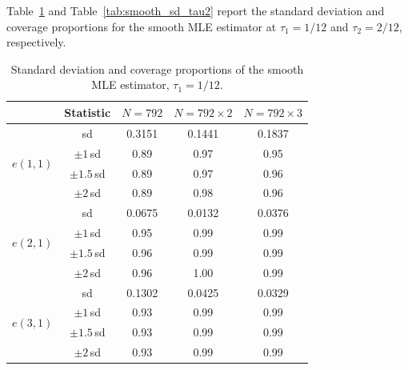 \documentclass[12pt]{article}
\begin{document}
Table~\ref{tab:smooth_sd_tau1} and Table~\ref{tab:smooth_sd_tau2} report
the standard deviation and coverage proportions for the smooth MLE estimator
at $\tau_1=1/12$ and $\tau_2=2/12$, respectively.

\begin{table}[H]
\centering
\caption{Standard deviation and coverage proportions of the smooth MLE estimator,
$\tau_1=1/12$.}
\label{tab:smooth_sd_tau1}
\begin{tabular}{lcccc}
\toprule
 & Statistic & $N=792$ & $N=792\times2$ & $N=792\times3$ \\
\midrule
\multirow{4}{*}{$e(1,1)$}
 & sd           & 0.3151 & 0.1441 & 0.1837 \\
 & $\pm1\,$sd   & 0.89   & 0.97   & 0.95   \\
 & $\pm1.5\,$sd & 0.89   & 0.97   & 0.96   \\
 & $\pm2\,$sd   & 0.89   & 0.98   & 0.96   \\
\midrule
\multirow{4}{*}{$e(2,1)$}
 & sd           & 0.0675 & 0.0132 & 0.0376 \\
 & $\pm1\,$sd   & 0.95   & 0.99   & 0.99   \\
 & $\pm1.5\,$sd & 0.96   & 0.99   & 0.99   \\
 & $\pm2\,$sd   & 0.96   & 1.00   & 0.99   \\
\midrule
\multirow{4}{*}{$e(3,1)$}
 & sd           & 0.1302 & 0.0425 & 0.0329 \\
 & $\pm1\,$sd   & 0.93   & 0.99   & 0.99   \\
 & $\pm1.5\,$sd & 0.93   & 0.99   & 0.99   \\
 & $\pm2\,$sd   & 0.93   & 0.99   & 0.99   \\
\bottomrule
\end{tabular}
\end{table}
\end{document}
